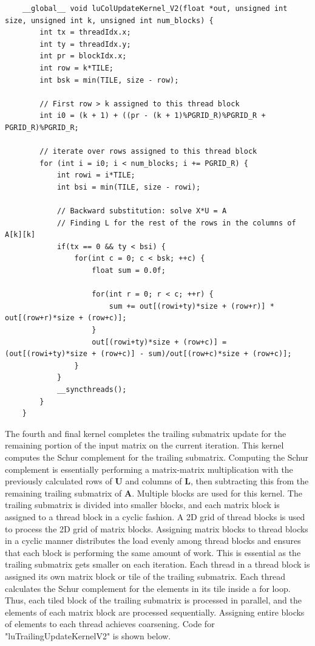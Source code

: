 \documentclass{article}
\begin{document}
\begin{verbatim}
	__global__ void luColUpdateKernel_V2(float *out, unsigned int size, unsigned int k, unsigned int num_blocks) {
		int tx = threadIdx.x;
		int ty = threadIdx.y;
		int pr = blockIdx.x;
		int row = k*TILE;
		int bsk = min(TILE, size - row);
		
		// First row > k assigned to this thread block
		int i0 = (k + 1) + ((pr - (k + 1)%PGRID_R)%PGRID_R + PGRID_R)%PGRID_R;
		
		// iterate over rows assigned to this thread block
		for (int i = i0; i < num_blocks; i += PGRID_R) {
			int rowi = i*TILE;
			int bsi = min(TILE, size - rowi);
			
			// Backward substitution: solve X*U = A
			// Finding L for the rest of the rows in the columns of A[k][k]
			if(tx == 0 && ty < bsi) {
				for(int c = 0; c < bsk; ++c) {
					float sum = 0.0f;
					
					for(int r = 0; r < c; ++r) {
						sum += out[(rowi+ty)*size + (row+r)] * out[(row+r)*size + (row+c)];
					}
					out[(rowi+ty)*size + (row+c)] = (out[(rowi+ty)*size + (row+c)] - sum)/out[(row+c)*size + (row+c)];
				}
			}
			__syncthreads();
		}
	}
\end{verbatim}

The fourth and final kernel completes the trailing submatrix update for the remaining portion of the input matrix on the current iteration. This kernel computes the Schur complement for the trailing submatrix. Computing the Schur complement is essentially performing a matrix-matrix multiplication with the previously calculated rows of $\mathbf{U}$ and columns of $\mathbf{L}$, then subtracting this from the remaining trailing submatrix of $\mathbf{A}$. Multiple blocks are used for this kernel. The trailing submatrix is divided into smaller blocks, and each matrix block is assigned to a thread block in a cyclic fashion. A 2D grid of thread blocks is used to process the 2D grid of matrix blocks. Assigning matrix blocks to thread blocks in a cyclic manner distributes the load evenly among thread blocks and ensures that each block is performing the same amount of work. This is essential as the trailing submatrix gets smaller on each iteration. Each thread in a thread block is assigned its own matrix block or tile of the trailing submatrix. Each thread calculates the Schur complement for the elements in its tile inside a for loop. Thus, each tiled block of the trailing submatrix is processed in parallel, and the elements of each matrix block are processed sequentially. Assigning entire blocks of elements to each thread achieves coarsening. Code for "luTrailingUpdateKernel\textunderscore V2" is shown below.
\end{document}
